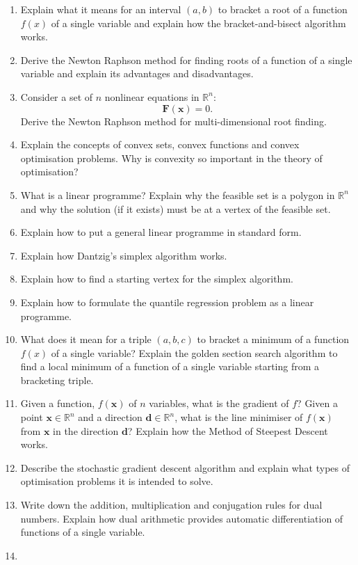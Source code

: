 \documentclass[11pt]{article}
\newcommand*{\xv}{\mathbf{x}}
\newcommand*{\dv}{\mathbf{d}}
\begin{document}
\begin{multicols}{2}
\begin{enumerate}
\item
Explain what it means for an interval $(a,b)$ to bracket a root of a function $f(x)$ of a single variable and explain how the bracket-and-bisect algorithm works.
\item
Derive the Newton Raphson method for finding roots of a function of a single variable and explain its advantages and disadvantages.
\item
Consider a set of $n$ nonlinear equations in $\mathbb{R}^n$:
\begin{displaymath}
\mathbf{F}(\xv) = 0.
\end{displaymath}
Derive the Newton Raphson method for multi-dimensional root finding. 
\item 
Explain the concepts of convex sets, convex functions and convex optimisation problems. Why is convexity so important in the theory of optimisation?
\item
What is a linear programme? Explain why the feasible set is a polygon in $\mathbb{R}^n$ and why the solution (if it exists) must be at a vertex of the feasible set.
\item
Explain how to put a general linear programme in standard form.
\item
Explain how Dantzig's simplex algorithm works.
\item Explain how to find a starting vertex for the simplex algorithm.
\item Explain how to formulate the quantile regression problem as a linear programme.
\item
What does it mean for a triple $(a, b, c)$ to bracket a minimum of a function $f(x)$ of a single variable? Explain the golden section search algorithm to find a local minimum of a function of a single variable starting from a bracketing triple.
\item
Given a function, $f(\xv)$ of $n$ variables, what is the gradient of $f$? Given a point $\xv \in \mathbb{R}^n$ and a direction $\dv \in \mathbb{R}^n$, what is the line minimiser of $f(\xv)$ from $\xv$ in the direction $\dv$? Explain how the Method of Steepest Descent works.
\item
Describe the stochastic gradient descent algorithm and explain what types of optimisation problems it is intended to solve.
\item
Write down the addition, multiplication and conjugation rules for dual numbers. Explain how dual arithmetic provides automatic differentiation of functions of a single variable. 
\item

\end{enumerate}
\end{multicols}
\end{document}
